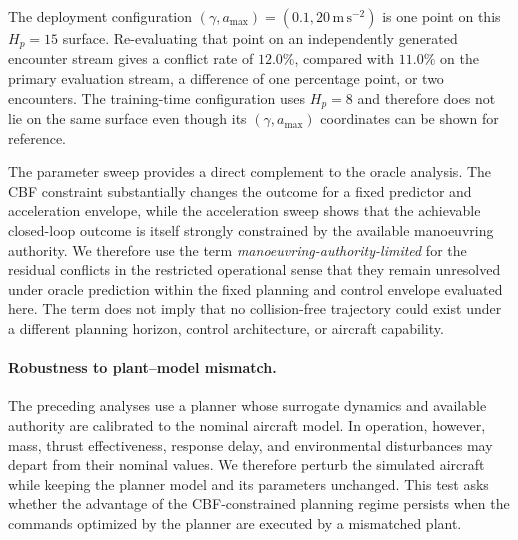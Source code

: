 \documentclass[11pt]{article}
\theoremstyle{plain}
\theoremstyle{definition}
\begin{document}
The deployment configuration
$(\gamma,a_{\max})=(0.1,20\,\mathrm{m\,s^{-2}})$ is one point on
this $H_p=15$ surface. Re-evaluating that point on an independently
generated encounter stream gives a conflict rate of $12.0\%$,
compared with $11.0\%$ on the primary evaluation stream, a
difference of one percentage point, or two encounters. The
training-time configuration uses $H_p=8$ and therefore does not lie
on the same surface even though its $(\gamma,a_{\max})$ coordinates
can be shown for reference.

The parameter sweep provides a direct complement to the oracle
analysis. The CBF constraint substantially changes the outcome for a
fixed predictor and acceleration envelope, while the acceleration
sweep shows that the achievable closed-loop outcome is itself strongly
constrained by the available manoeuvring authority. We therefore use
the term \emph{manoeuvring-authority-limited} for the residual
conflicts in the restricted operational sense that they remain
unresolved under oracle prediction within the fixed planning and
control envelope evaluated here. The term does not imply that no
collision-free trajectory could exist under a different planning
horizon, control architecture, or aircraft capability.

\paragraph{Robustness to plant--model mismatch.}

The preceding analyses use a planner whose surrogate dynamics and
available authority are calibrated to the nominal aircraft model. In
operation, however, mass, thrust effectiveness, response delay, and
environmental disturbances may depart from their nominal values. We
therefore perturb the simulated aircraft while keeping the planner
model and its parameters unchanged. This test asks whether the
advantage of the CBF-constrained planning regime persists when the
commands optimized by the planner are executed by a mismatched plant.
\end{document}

